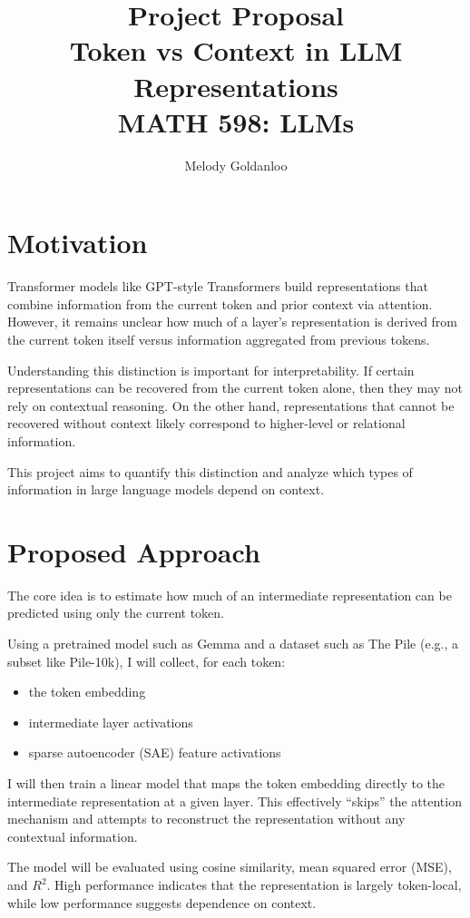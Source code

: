 \documentclass{article}
\title{Project Proposal\\[2ex] Token vs Context in LLM Representations\\[2ex] \large MATH 598: LLMs}
\author{Melody Goldanloo}
\date{}
\begin{document}
\maketitle

\section{Motivation}

Transformer models like GPT-style Transformers build representations that combine information from the current token and prior context via attention. However, it remains unclear how much of a layer's representation is derived from the current token itself versus information aggregated from previous tokens.

Understanding this distinction is important for interpretability. If certain representations can be recovered from the current token alone, then they may not rely on contextual reasoning. On the other hand, representations that cannot be recovered without context likely correspond to higher-level or relational information.

This project aims to quantify this distinction and analyze which types of information in large language models depend on context.

\section{Proposed Approach}

The core idea is to estimate how much of an intermediate representation can be predicted using only the current token.

Using a pretrained model such as Gemma and a dataset such as The Pile (e.g., a subset like Pile-10k), I will collect, for each token:
\begin{itemize}
    \item the token embedding
    \item intermediate layer activations
    \item sparse autoencoder (SAE) feature activations
\end{itemize}

I will then train a linear model that maps the token embedding directly to the intermediate representation at a given layer. This effectively ``skips'' the attention mechanism and attempts to reconstruct the representation without any contextual information.

The model will be evaluated using cosine similarity, mean squared error (MSE), and $R^2$. High performance indicates that the representation is largely token-local, while low performance suggests dependence on context.
\end{document}
